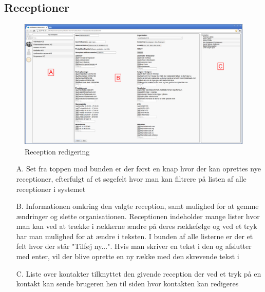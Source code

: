 
\pagebreak
\subsection{Receptioner}
\begin{figure}[ht!]
\centering
\includegraphics[width=\textwidth]{images/screen_rec.png}
\caption{Reception redigering}
\label{fig:screenrec}
\end{figure}
\begin{enumerate}
	\item[A.] {Set fra toppen mod bunden er der først en knap hvor der kan oprettes nye receptioner, efterfulgt af et søgefelt hvor man kan filtrere på listen af alle receptioner i systemet}
	\item[B.] {Informationen omkring den valgte reception, samt mulighed for at gemme ændringer og slette organisationen. Receptionen indeholder mange lister hvor man kan ved at trække i rækkerne ændre på deres rækkefølge og ved et tryk har man mulighed for at ændre i teksten. I bunden af alle listerne er der et felt hvor der står "Tilføj ny...". Hvis man skriver en tekst i den og afslutter med enter, vil der blive oprette en ny række med den skrevende tekst i}
	\item[C.] {Liste over kontakter tilknyttet den givende reception der ved et tryk på en kontakt kan sende brugeren hen til siden hvor kontakten kan redigeres}
\end{enumerate}


